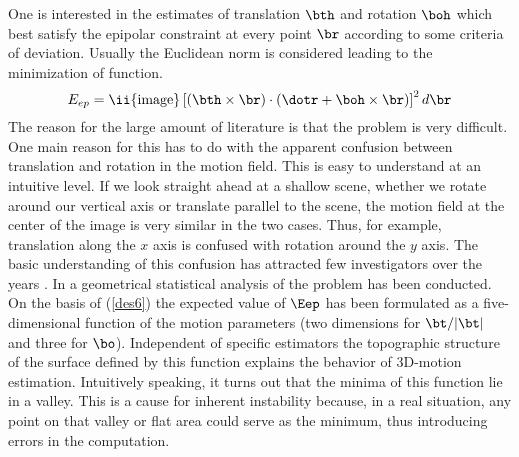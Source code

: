 \documentclass[10pt,twocolumn]{article}
\begin{document}
One is interested in the estimates of translation $\bth$ and rotation
$\boh$ which best satisfy the epipolar constraint at every point $\br$
according to some criteria of deviation. Usually the Euclidean norm is
considered leading to the minimization of function.
\begin{equation}
  \label{des6}
  E_{ep} = \ii{\rm image} \left[\left(\bth \times \br\right) \cdot
  \left(\dotr + \boh \times \br\right)\right]^2 d\br
\end{equation}
The reason for the large amount of literature is that the problem is
very difficult. One main reason for this has to do with the apparent
confusion between translation and rotation in the motion field. This
is easy to understand at an intuitive level. If we look straight ahead
at a shallow scene, whether we rotate around our vertical axis or
translate parallel to the scene, the motion field at the center of the
image is very similar in the two cases. Thus, for example, translation
along the $x$ axis is confused with rotation around the $y$ axis.  The
basic understanding of this confusion has attracted few investigators
over the years \cite{Dani92,Kosta96}. In \cite{proofijcv,feraloi98a} a
geometrical statistical analysis of the problem has been conducted. On
the basis of (\ref{des6}) the expected value of $\Eep$ has been
formulated as a five-dimensional function of the motion parameters
(two dimensions for $\bt/|\bt|$ and three for $\bo$). Independent of
specific estimators the topographic structure of the surface defined
by this function explains the behavior of 3D-motion estimation.
Intuitively speaking, it turns out that the minima of this function
lie in a valley. This is a cause for inherent instability because, in
a real situation, any point on that valley or flat area could serve as
the minimum, thus introducing errors in the computation.
\end{document}
